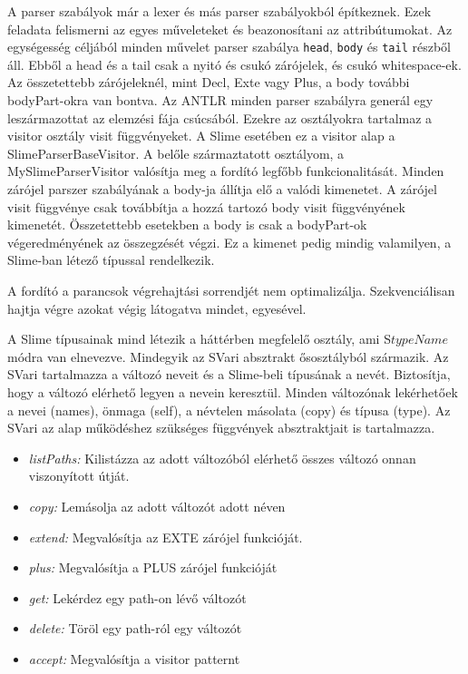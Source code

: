 {A parser szabályok már a lexer és más parser szabályokból építkeznek. 
Ezek feladata felismerni az egyes műveleteket és beazonosítani az attribútumokat. 
Az egységesség céljából minden művelet parser szabálya \texttt{head}, \texttt{body} és \texttt{tail} részből áll.
Ebből a head és a tail csak a nyitó és csukó zárójelek, és csukó whitespace-ek. 
Az összetettebb zárójeleknél, mint Decl, Exte vagy Plus, a body további bodyPart-okra van bontva. 
Az ANTLR minden parser szabályra generál egy leszármazottat az elemzési fája csúcsából. 
Ezekre az osztályokra tartalmaz a visitor osztály visit függvényeket. 
A Slime esetében ez a visitor alap a SlimeParserBaseVisitor.
A belőle származtatott osztályom, a MySlimeParserVisitor valósítja meg a fordító legfőbb funkcionalitását. 
Minden zárójel parszer szabályának a body-ja állítja elő a valódi kimenetet.
A zárójel visit függvénye csak továbbítja a hozzá tartozó body visit függvényének kimenetét. 
Összetettebb esetekben a body is csak a bodyPart-ok végeredményének az összegzését végzi. 
Ez a kimenet pedig mindig valamilyen, a Slime-ban létező típussal rendelkezik.

A fordító a parancsok végrehajtási sorrendjét nem optimalizálja.
Szekvenciálisan hajtja végre azokat végig látogatva mindet, egyesével.

A Slime típusainak mind létezik a háttérben megfelelő osztály, ami S{$ typeName $} módra van elnevezve. 
Mindegyik az SVari absztrakt ősosztályból származik.
Az SVari tartalmazza a változó neveit és a Slime-beli típusának a nevét.
Biztosítja, hogy a változó elérhető legyen a nevein keresztül.
Minden változónak lekérhetőek a nevei (names), önmaga (self), a névtelen másolata (copy) és típusa (type).
Az SVari az alap működéshez szükséges függvények absztraktjait is tartalmazza. 
\begin{itemize}
\item \emph{listPaths:} Kilistázza az adott változóból elérhető összes változó onnan viszonyított útját.
\item \emph{copy:} Lemásolja az adott változót adott néven
\item \emph{extend:} Megvalósítja az EXTE zárójel funkcióját.
\item \emph{plus:} Megvalósítja a PLUS zárójel funkcióját
\item \emph{get:} Lekérdez egy path-on lévő változót
\item \emph{delete:} Töröl egy path-ról egy változót
\item \emph{accept:} Megvalósítja a visitor patternt
\end{itemize}

}
